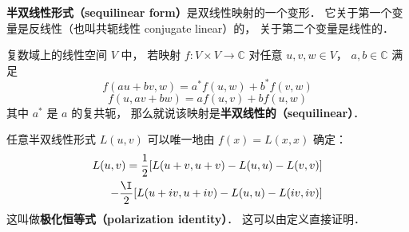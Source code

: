 
\begin{issues}
\issueDraft
\end{issues}

\textbf{半双线性形式（sequilinear form）}是双线性映射的一个变形． 它关于第一个变量是反线性（也叫共轭线性 conjugate linear）的， 关于第二个变量是线性的．
\begin{definition}{}
复数域上的线性空间 $V$ 中， 若映射 $f:V\times V\to \mathbb C$ 对任意 $u, v, w\in V$， $a,b\in \mathbb C$ 满足
\begin{equation}\label{sequil_eq2}
f(au+bv, w) = a^*f(u, w) + b^*f(v, w)
\end{equation}
\begin{equation}\label{sequil_eq1}
f(u, av+bw) = af(u, v) + bf(u, w)
\end{equation}
其中 $a^*$ 是 $a$ 的复共轭， 那么就说该映射是\textbf{半双线性的（sequilinear）}．
\end{definition}

任意半双线性形式 $L(u, v)$ 可以唯一地由 $f(x) = L(x, x)$ 确定：
\begin{equation}
\begin{aligned}
L(u, v) =\frac{1}{2}[L(u+v, u+v)-L(u, u)-L(v, v)]\\
-\frac{\I}{2}[L(u+i v, u+i v)-L(u, u)-L(i v, i v)]
\end{aligned}
\end{equation}
这叫做\textbf{极化恒等式（polarization identity）}． 这可以由定义直接证明．
